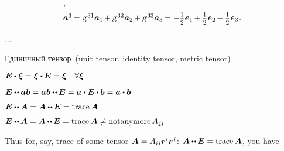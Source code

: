 \begin{otherlanguage}{russian}
\begin{tcolorbox}
\[\begin{array}{l}
\hspace{.1ex} ,
\\[.5em]
%
\bm{a}^3 \hspace{-0.2ex}=\hspace{.1ex} \textsl{g}^{\hspace{.2ex}31} \bm{a}_1 \hspace{-0.2ex} + \textsl{g}^{\hspace{.2ex}32} \bm{a}_2 \hspace{-0.2ex} + \textsl{g}^{\hspace{.2ex}33} \bm{a}_3 \hspace{-0.2ex} = - \smalldisplaystyleonehalf \bm{e}_1 \hspace{-0.2ex} + \smalldisplaystyleonehalf \bm{e}_2 \hspace{-0.2ex} + \smalldisplaystyleonehalf \bm{e}_3
\hspace{.16ex} .
\end{array}\]

\par\end{tcolorbox}

...


Единичный тензор~(unit tensor, identity tensor, metric tensor)

$\UnitDyad \dotp \hspace{.1ex} \bm{\xi} = \bm{\xi} \hspace{.1ex} \dotp \hspace{-0.12ex} \UnitDyad = \bm{\xi} \quad \forall \bm{\xi}$

$\UnitDyad \dotdotp \bm{a} \bm{b} = \bm{a} \bm{b} \dotdotp \hspace{-0.12ex} \UnitDyad = \bm{a} \dotp \UnitDyad \dotp \bm{b} = \bm{a} \dotp \bm{b}$

$\UnitDyad \dotdotp \bm{A} = \bm{A} \dotdotp \hspace{-0.12ex} \UnitDyad = \trace{\hspace{-0.1ex}\bm{A}}$

$\UnitDyad \dotdotp \hspace{-0.1ex} \bm{A} = \bm{A} \dotdotp \hspace{-0.12ex} \UnitDyad = \trace{\hspace{-0.1ex}\bm{A}} \neq \operatorname{not anymore} A_{j\hspace{-0.12ex}j}$

Thus for, say, trace of some tensor ${\bm{A} = A_{i\hspace{-0.1ex}j} \bm{r}^i \bm{r}^j}$: ${\bm{A} \dotdotp \hspace{-0.12ex} \UnitDyad = \trace{\hspace{-0.1ex}\bm{A}}}$, you have


\end{otherlanguage}
